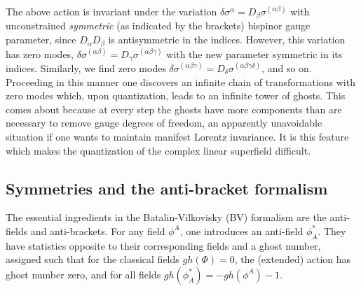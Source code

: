 \documentclass[a4paper,12pt]{article}
\begin{document}
The above action is invariant under the variation $\delta
\sigma^\alpha = D_\beta \sigma^{(\alpha \beta)}$ with unconstrained
{\em symmetric} (as indicated by the brackets) bispinor gauge
parameter, since $D_\alpha D_\beta$ is antisymmetric in the indices.
However, this variation has zero modes, $\delta \sigma^{(\alpha
  \beta)} = D_\gamma \sigma^{(\alpha \beta \gamma)}$ with the new
parameter symmetric in its indices.  Similarly, we find zero modes
$\delta \sigma^{(\alpha\beta \gamma)} = D_\delta \sigma^{(\alpha\beta
  \gamma \delta)}$, and so on. Proceeding in this manner one discovers
an infinite chain of transformations with zero modes which, upon
quantization, leads to an infinite tower of ghosts. This comes about
because at every step the ghosts have more components than are
necessary to remove gauge degrees of freedom, an apparently
unavoidable situation if one wants to maintain manifest Lorentz
invariance.  It is this feature which makes the quantization of the
complex linear superfield difficult.


\subsection{Symmetries and the anti-bracket formalism}
\label{BV}

The essential ingredients in the Batalin-Vilkovisky (BV)
\cite{BV,cano,gomis,henne_libro,anti_coho} formalism are the anti-fields and
anti-brackets. For any field $\phi ^A$, one introduces an anti-field
$\phi ^*_A$.  They have statistics opposite to their corresponding
fields and a ghost number, assigned such that for the classical fields
$gh(\Phi) =0$, the (extended) action has ghost number zero, and for
all fields $gh(\phi^*_A )= -gh(\phi ^A)-1$.
\end{document}
